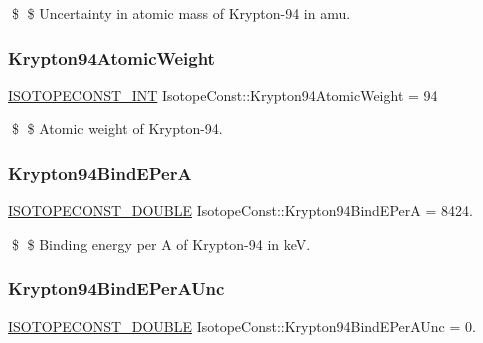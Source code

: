 \$ \$ Uncertainty in atomic mass of Krypton-\/94 in amu. \mbox{\label{group___isotope_const-_krypton-_kr94_gaf8db32d2f490cd3092156830fd2d0765}} 
\subsubsection{\texorpdfstring{Krypton94\+Atomic\+Weight}{Krypton94AtomicWeight}}
{\footnotesize\ttfamily \mbox{\hyperlink{group___isotope_const-_macros_ga5f18360b3e99483a35c32d789e62621c}{I\+S\+O\+T\+O\+P\+E\+C\+O\+N\+S\+T\+\_\+\+I\+NT}} Isotope\+Const\+::\+Krypton94\+Atomic\+Weight = 94}

\$ \$ Atomic weight of Krypton-\/94. \mbox{\label{group___isotope_const-_krypton-_kr94_gafef054fdff41f92eb301e0fedb7d5e0e}} 
\subsubsection{\texorpdfstring{Krypton94\+Bind\+E\+PerA}{Krypton94BindEPerA}}
{\footnotesize\ttfamily \mbox{\hyperlink{group___isotope_const-_macros_ga8f45a7272ce02c0b4c65c44636ed719a}{I\+S\+O\+T\+O\+P\+E\+C\+O\+N\+S\+T\+\_\+\+D\+O\+U\+B\+LE}} Isotope\+Const\+::\+Krypton94\+Bind\+E\+PerA = 8424.}

\$ \$ Binding energy per A of Krypton-\/94 in keV. \mbox{\label{group___isotope_const-_krypton-_kr94_gacde04c1325836fed1f131c7b91cd2b44}} 
\subsubsection{\texorpdfstring{Krypton94\+Bind\+E\+Per\+A\+Unc}{Krypton94BindEPerAUnc}}
{\footnotesize\ttfamily \mbox{\hyperlink{group___isotope_const-_macros_ga8f45a7272ce02c0b4c65c44636ed719a}{I\+S\+O\+T\+O\+P\+E\+C\+O\+N\+S\+T\+\_\+\+D\+O\+U\+B\+LE}} Isotope\+Const\+::\+Krypton94\+Bind\+E\+Per\+A\+Unc = 0.}

